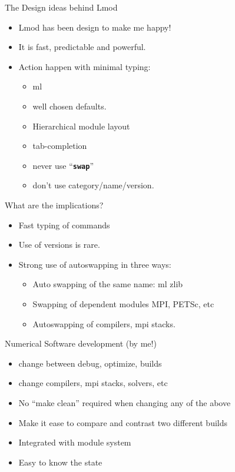\documentclass{beamer}
\begin{document}
\begin{frame}{The Design ideas behind Lmod}
  \begin{itemize}
     \item Lmod has been design to make me happy!
     \item It is fast, predictable and powerful.
     \item Action happen with minimal typing:
       \begin{itemize}
          \item ml
          \item well chosen defaults.
          \item Hierarchical module layout
          \item tab-completion
          \item never use ``\texttt{\bf swap}''
          \item don't use category/name/version.
       \end{itemize}
  \end{itemize}
\end{frame}


\begin{frame}{What are the implications?}
  \begin{itemize}
     \item Fast typing of commands
     \item Use of versions is rare.
     \item Strong use of autoswapping in three ways:
       \begin{itemize}
          \item Auto swapping of the same name: ml zlib
          \item Swapping of dependent modules MPI, PETSc, etc
          \item Autoswapping of compilers, mpi stacks.
       \end{itemize}
  \end{itemize}
\end{frame}

\begin{frame}{Numerical Software development (by me!)}
  \begin{itemize}
    \item change between debug, optimize, builds
    \item change compilers, mpi stacks, solvers, etc
    \item No ``make clean'' required when changing any of the above
    \item Make it ease to compare and contrast two different builds
    \item Integrated with module system
    \item Easy to know the state
  \end{itemize}
\end{frame}
\end{document}
